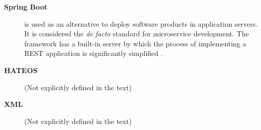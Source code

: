 \begin{description}
\item[\textbf{Spring Boot}] is used as an alternative to deploy software products in application servers. It is considered the \textit{de facto} standard for microservice development. The framework has a built-in server by which the process of implementing a REST application is significantly simplified \cite{gomez2020crudyleaf}.

\item[\textbf{HATEOS}]  
(Not explicitly defined in the text)

\item[\textbf{XML}] 
(Not explicitly defined in the text)

\end{description}
